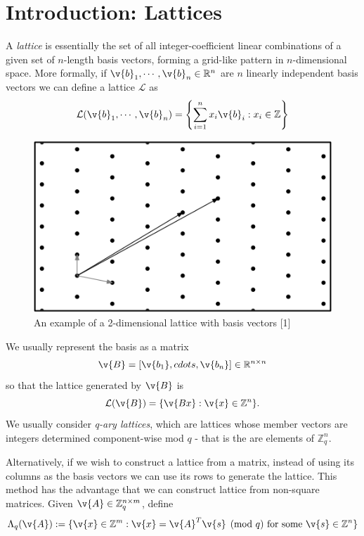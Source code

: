 \section{Introduction: Lattices}\label{sec:lattice_intro}
    A \textit{lattice} is essentially the set of all integer-coefficient linear combinations 
    of a given set of $n$-length basis vectors, forming a grid-like 
    pattern in $n$-dimensional space.
    More formally, if $\v{b}_1,\cdots,\v{b}_n \in \mathbb{R}^n$ are $n$ linearly independent basis vectors 
    we can define a lattice $\mathcal{L}$ as
\begin{equation*}
    \mathcal{L}(\v{b}_1,\cdots,\v{b}_n) = \left\{\sum_{i=1}^n{x_i\v{b}_i : x_i \in \mathbb{Z}}\right\}
\end{equation*}
\begin{figure}[h!]
    \caption{An example of a 2-dimensional lattice with basis vectors [1]}
    \centering
    \includegraphics[scale=0.3]{lattice.png}
\end{figure}
We usually represent the basis as a matrix 
\begin{equation*}
    \v{B} = [\v{b_1}, cdots, \v{b_n}] \in \mathbb{R}^{n \times n}
\end{equation*}
so that the lattice generated by $\v{B}$ is
\begin{equation*}
    \mathcal{L}(\v{B}) = \{\v{Bx}: \v{x} \in \mathbb{Z}^n\}.
\end{equation*}
We usually consider \textit{q-ary lattices}, which are lattices whose
member vectors are integers determined component-wise mod $q$ - that
is the are elements of $\mathbb{Z}_q^n$.

Alternatively, if we wish to construct a lattice from a matrix, instead
of using its columns as the basis vectors we can use its rows to 
generate the lattice. This method has the advantage that we can construct
lattice from non-square matrices. Given $\v{A} \in \mathbb{Z}_q^{n \times m}$, define
\begin{equation}
    \Lambda_q(\v{A}) := \{\v{x} \in \mathbb{Z}^m: \v{x} = \v{A}^T\v{s}
        \pmod{q} \text{ for some } \v{s} \in \mathbb{Z}^n
    \}
\end{equation}

